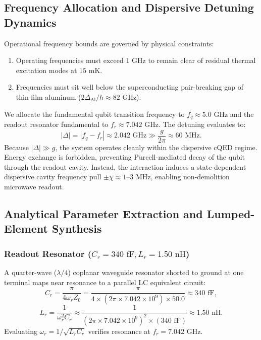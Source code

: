 \documentclass[10pt,journal,compsoc]{IEEEtran}
\begin{document}
\subsection{Frequency Allocation and Dispersive Detuning Dynamics}
Operational frequency bounds are governed by physical constraints:
\begin{enumerate}
    \item Operating frequencies must exceed $1\text{ GHz}$ to remain clear of residual thermal excitation modes at $15\text{ mK}$.
    \item Frequencies must sit well below the superconducting pair-breaking gap of thin-film aluminum ($2\Delta_{\text{Al}}/h \approx 82\text{ GHz}$).
\end{enumerate}

We allocate the fundamental qubit transition frequency to $f_q \approx 5.0\text{ GHz}$ and the readout resonator fundamental to $f_r \approx 7.042\text{ GHz}$. The detuning evaluates to:
\begin{equation}
|\Delta| = |f_q - f_r| \approx 2.042\text{ GHz} \gg \frac{g}{2\pi} \approx 60\text{ MHz}.
\end{equation}
Because $|\Delta| \gg g$, the system operates cleanly within the dispersive cQED regime. Energy exchange is forbidden, preventing Purcell-mediated decay of the qubit through the readout cavity. Instead, the interaction induces a state-dependent dispersive cavity frequency pull $\pm \chi \approx 1\text{--}3\text{ MHz}$, enabling non-demolition microwave readout.

\subsection{Analytical Parameter Extraction and Lumped-Element Synthesis}

\subsubsection{Readout Resonator (\texorpdfstring{$C_r = 340\text{ fF}, L_r = 1.50\text{ nH}$}{Cr = 340 fF, Lr = 1.50 nH})}
A quarter-wave ($\lambda/4$) coplanar waveguide resonator shorted to ground at one terminal maps near resonance to a parallel LC equivalent circuit:
\begin{equation}
C_r = \frac{\pi}{4 \omega_r Z_0} = \frac{\pi}{4 \times (2\pi \times 7.042\times 10^9) \times 50.0} \approx 340\text{ fF},
\end{equation}
\begin{equation}
L_r = \frac{1}{\omega_r^2 C_r} \approx \frac{1}{(2\pi \times 7.042\times 10^9)^2 \times (340\text{ fF})} \approx 1.50\text{ nH}.
\end{equation}
Evaluating $\omega_r = 1/\sqrt{L_r C_r}$ verifies resonance at $f_r = 7.042\text{ GHz}$.
\end{document}
